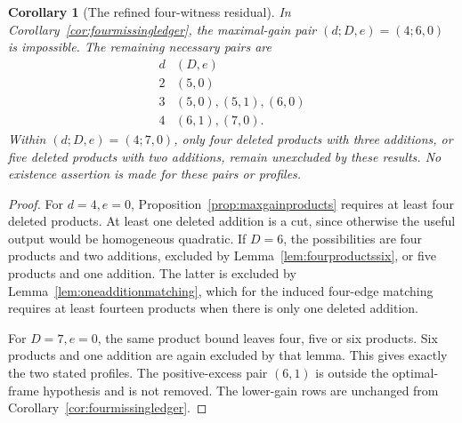 \documentclass[11pt]{article}
\newtheorem{corollary}[theorem]{Corollary}
\theoremstyle{definition}
\theoremstyle{remark}
\begin{document}
\begin{corollary}[The refined four-witness residual]\label{cor:refinedfourledger}
In Corollary~\ref{cor:fourmissingledger}, the maximal-gain pair $(d;D,e)=(4;6,0)$ is impossible. The remaining necessary pairs are
\[
\begin{array}{c|l}
 d&(D,e)\\ \hline
 2&(5,0)\\
 3&(5,0),(5,1),(6,0)\\
 4&(6,1),(7,0).
\end{array}
\]
Within $(d;D,e)=(4;7,0)$, only four deleted products with three additions, or five deleted products with two additions, remain unexcluded by these results. No existence assertion is made for these pairs or profiles.
\end{corollary}
\begin{proof}
For $d=4,e=0$, Proposition~\ref{prop:maxgainproducts} requires at least four deleted products. At least one deleted addition is a cut, since otherwise the useful output would be homogeneous quadratic. If $D=6$, the possibilities are four products and two additions, excluded by Lemma~\ref{lem:fourproductssix}, or five products and one addition. The latter is excluded by Lemma~\ref{lem:oneadditionmatching}, which for the induced four-edge matching requires at least fourteen products when there is only one deleted addition.

For $D=7,e=0$, the same product bound leaves four, five or six products. Six products and one addition are again excluded by that lemma. This gives exactly the two stated profiles. The positive-excess pair $(6,1)$ is outside the optimal-frame hypothesis and is not removed. The lower-gain rows are unchanged from Corollary~\ref{cor:fourmissingledger}.
\end{proof}
\end{document}

